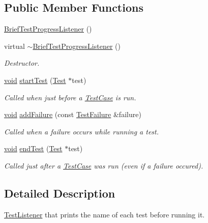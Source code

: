 \subsection*{Public Member Functions}
\begin{DoxyCompactItemize}
\item 
\hyperlink{class_brief_test_progress_listener_a7af12547b437fcddab52e7b0f0d47782}{Brief\-Test\-Progress\-Listener} ()
\item 
virtual \hyperlink{class_brief_test_progress_listener_a9e1cf4460bdb460e14009d1629454881}{$\sim$\-Brief\-Test\-Progress\-Listener} ()
\begin{DoxyCompactList}\small\item\em Destructor. \end{DoxyCompactList}\item 
\hyperlink{wglew_8h_aeea6e3dfae3acf232096f57d2d57f084}{void} \hyperlink{class_brief_test_progress_listener_ab4196e15752bb2be443e72418500e20e}{start\-Test} (\hyperlink{class_test}{Test} $\ast$test)
\begin{DoxyCompactList}\small\item\em Called when just before a \hyperlink{class_test_case}{Test\-Case} is run. \end{DoxyCompactList}\item 
\hyperlink{wglew_8h_aeea6e3dfae3acf232096f57d2d57f084}{void} \hyperlink{class_brief_test_progress_listener_a21f8658a9c19c67220241656cfad30ce}{add\-Failure} (const \hyperlink{class_test_failure}{Test\-Failure} \&failure)
\begin{DoxyCompactList}\small\item\em Called when a failure occurs while running a test. \end{DoxyCompactList}\item 
\hyperlink{wglew_8h_aeea6e3dfae3acf232096f57d2d57f084}{void} \hyperlink{class_brief_test_progress_listener_a49cbd9152ea35a21f6525773660ee119}{end\-Test} (\hyperlink{class_test}{Test} $\ast$test)
\begin{DoxyCompactList}\small\item\em Called just after a \hyperlink{class_test_case}{Test\-Case} was run (even if a failure occured). \end{DoxyCompactList}\end{DoxyCompactItemize}


\subsection{Detailed Description}
\hyperlink{class_test_listener}{Test\-Listener} that prints the name of each test before running it. 

